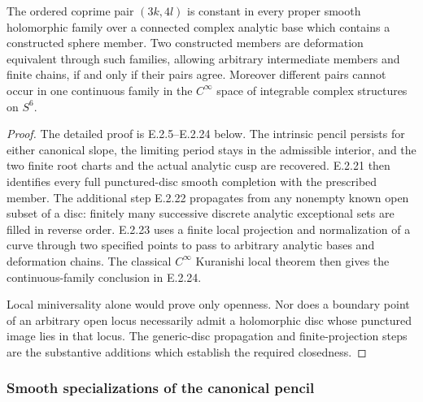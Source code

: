 \begin{corollary}
The ordered coprime pair $(3k,4l)$ is constant in every
proper smooth holomorphic family over a connected complex
analytic base which contains a constructed sphere member.
Two constructed members are deformation equivalent through
such families, allowing arbitrary intermediate members and
finite chains, if and only if their pairs agree.
Moreover different pairs cannot occur in one continuous
family in the $C^\infty$ space of integrable complex
structures on $S^6$.
\end{corollary}
\begin{proof}
The detailed proof is E.2.5--E.2.24 below.  The intrinsic
pencil persists for either canonical slope, the limiting
period stays in the admissible interior, and the two finite
root charts and the actual analytic cusp are recovered.
E.2.21 then identifies every full punctured-disc smooth
completion with the prescribed member.  The additional
step E.2.22 propagates from any nonempty known open subset
of a disc: finitely many successive discrete analytic
exceptional sets are filled in reverse order.  E.2.23 uses
a finite local projection and normalization of a curve
through two specified points to pass to arbitrary analytic
bases and deformation chains.
The classical $C^\infty$ Kuranishi local theorem then
gives the continuous-family conclusion in E.2.24.

Local miniversality alone would prove only openness.
Nor does a boundary point of an arbitrary open locus
necessarily admit a holomorphic disc whose punctured
image lies in that locus.  The generic-disc propagation
and finite-projection steps are the substantive additions
which establish the required closedness.
\end{proof}

\subsubsection*{Smooth specializations of the canonical pencil}

